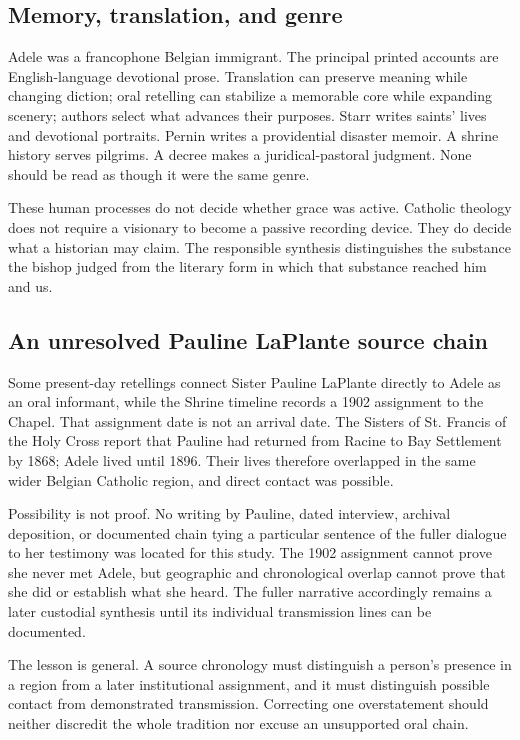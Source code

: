 \subsection{Memory, translation, and genre}

Adele was a francophone Belgian immigrant. The principal printed accounts are English-language devotional prose. Translation can preserve meaning while changing diction; oral retelling can stabilize a memorable core while expanding scenery; authors select what advances their purposes. Starr writes saints' lives and devotional portraits. Pernin writes a providential disaster memoir. A shrine history serves pilgrims. A decree makes a juridical-pastoral judgment. None should be read as though it were the same genre.

These human processes do not decide whether grace was active. Catholic theology does not require a visionary to become a passive recording device. They do decide what a historian may claim. The responsible synthesis distinguishes the substance the bishop judged from the literary form in which that substance reached him and us.


\subsection{An unresolved Pauline LaPlante source chain}

Some present-day retellings connect Sister Pauline LaPlante directly to Adele as an oral informant, while the Shrine timeline records a 1902 assignment to the Chapel. That assignment date is not an arrival date. The Sisters of St. Francis of the Holy Cross report that Pauline had returned from Racine to Bay Settlement by 1868; Adele lived until 1896. Their lives therefore overlapped in the same wider Belgian Catholic region, and direct contact was possible.

Possibility is not proof. No writing by Pauline, dated interview, archival deposition, or documented chain tying a particular sentence of the fuller dialogue to her testimony was located for this study. The 1902 assignment cannot prove she never met Adele, but geographic and chronological overlap cannot prove that she did or establish what she heard. The fuller narrative accordingly remains a later custodial synthesis until its individual transmission lines can be documented.

The lesson is general. A source chronology must distinguish a person's presence in a region from a later institutional assignment, and it must distinguish possible contact from demonstrated transmission. Correcting one overstatement should neither discredit the whole tradition nor excuse an unsupported oral chain.
